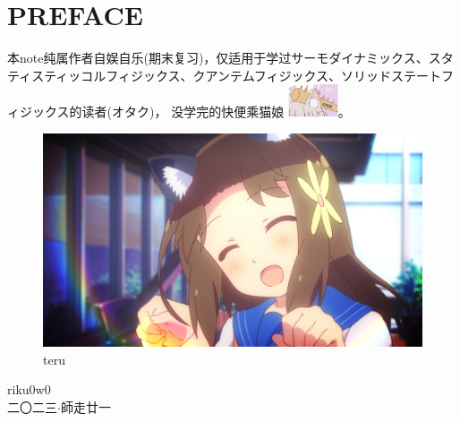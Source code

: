 \chapter*{PREFACE}

本note纯属作者自娱自乐(期末复习)，仅适用于学过\mincho サーモダイナミックス、スタティスティッコルフィジックス、クアンテムフィジックス、ソリッドステートフィジックス\FandolSong 的读者(オタク)，\vspace{1ex}
没学完的快便乘猫娘 \includegraphics[width=4em,align=c]{idiot.jpg}。
\begin{figure}[ht]
    \centering
    \includegraphics[width=\linewidth]{teru.png}
    \caption*{teru}
    \label{fig:teru-star}
\end{figure}

\begin{flushright}
	riku0w0 \\
	二〇二三$\cdot$師走廿一\\
\end{flushright}

